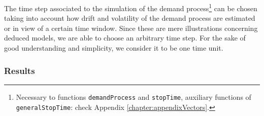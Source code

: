 

The time step associated to the simulation of the demand process\footnote{Necessary to functions \texttt{demandProcess} and \texttt{stopTime}, auxiliary functions of \texttt{generalStopTime}: check Appendix \ref{chapter:appendixVectors}.} can be chosen taking into account how drift and volatility of the demand process are estimated or in view of a certain time window.
Since these are mere illustrations concerning deduced models, we are able to choose an arbitrary time step. For the sake of good understanding and simplicity, we consider it to be one time unit.





\subsubsection{Results}

